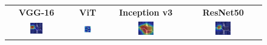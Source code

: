 \documentclass[a4paper,12pt]{report}
\begin{document}
\begin{figure}[H]
    \centering
    \setlength{\tabcolsep}{1pt}
    \begin{tabular}{cccc}
    \textbf{VGG-16} & \textbf{ViT} & \textbf{Inception v3} & \textbf{ResNet50} \\
    
    \includegraphics[width=0.22\textwidth]{images/appendix/modelgraph/vgg/correct/Slaty_Backed_Gull/20241204_170332.jpg} &
    \includegraphics[width=0.22\textwidth]{images/appendix/modelgraph/vit/correct/Slaty_Backed_Gull/20241204_170332.jpg} &
    \includegraphics[width=0.22\textwidth]{images/appendix/modelgraph/inception/correct/Slaty_Backed_Gull/20241204_170332.jpg} &
    \includegraphics[width=0.22\textwidth]{images/appendix/modelgraph/resnet/correct/Slaty_Backed_Gull/20241204_170332.jpg} \\
    \end{tabular}

    \label{fig:interpretability_slaty_4}
\end{figure}
\end{document}
